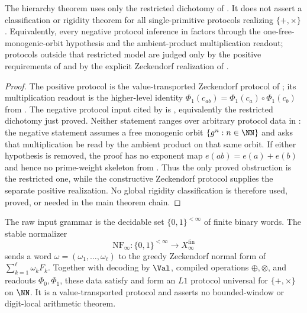 \begin{theorem}
\label{prop:no-global-protocol-rigidity-input}
\label{thm:main-chain-protocol-rigidity-boundary}
The hierarchy theorem uses only the restricted dichotomy of
.  It does not assert a
classification or rigidity theorem for all single-primitive protocols realizing
\(\{+,\times\}\).  Equivalently, every negative protocol inference in
 factors through the one-free-monogenic-orbit hypothesis
and the ambient-product multiplication readout; protocols outside that
restricted model are judged only by the positive requirements of
 and by the explicit Zeckendorf realization of
.
\end{theorem}

\begin{proof}
The positive protocol is the value-transported Zeckendorf protocol of
; its multiplication readout is the
higher-level identity \(\Phi_1(c_{ab})=\Phi_1(c_a)\circ\Phi_1(c_b)\) from
.  The negative protocol input cited by
 is , equivalently the
restricted dichotomy just proved.  Neither statement ranges over arbitrary
protocol data in : the negative statement assumes a free
monogenic orbit \(\{g^n:n\in\NN\}\) and asks that multiplication be read by the
ambient product on that same orbit.  If either hypothesis is removed, the proof
has no exponent map \(e(ab)=e(a)+e(b)\) and hence no prime-weight skeleton from
.  Thus the only proved obstruction is
the restricted one, while the constructive Zeckendorf protocol supplies the
separate positive realization.  No global rigidity classification is therefore
used, proved, or needed in the main theorem chain.
\end{proof}

\begin{theorem}
\label{thm:zeckendorf-protocol-univ}
The raw input grammar is the decidable set \(\{0,1\}^{<\infty}\) of finite
binary words.  The stable normalizer
\[
  \mathrm{NF}_\infty\colon \{0,1\}^{<\infty}\to X_\infty^{\mathrm{fin}}
\]
sends a word \(\omega=(\omega_1,\ldots,\omega_\ell)\) to the greedy Zeckendorf
normal form of \(\sum_{k=1}^\ell \omega_kF_k\).  Together with decoding by
\(\Val\), compiled operations \(\oplus,\otimes\), and readouts
\(\Phi_0,\Phi_1\), these data satisfy  and form an \(L1\)
protocol universal for \(\{+,\times\}\) on \(\NN\).  It is a value-transported
protocol and asserts no bounded-window or digit-local arithmetic theorem.
\end{theorem}

